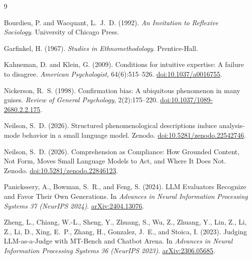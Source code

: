 \documentclass[11pt,a4paper]{article}
\begin{document}
\begin{thebibliography}{9}

Bourdieu, P. and Wacquant, L.~J.~D. (1992).
\newblock \emph{An Invitation to Reflexive Sociology}.
\newblock University of Chicago Press.

Garfinkel, H. (1967).
\newblock \emph{Studies in Ethnomethodology}.
\newblock Prentice-Hall.

Kahneman, D. and Klein, G. (2009).
\newblock Conditions for intuitive expertise: A failure to disagree.
\newblock \emph{American Psychologist}, 64(6):515--526.
  \href{https://doi.org/10.1037/a0016755}{doi:10.1037/a0016755}.

Nickerson, R.~S. (1998).
\newblock Confirmation bias: A ubiquitous phenomenon in many guises.
\newblock \emph{Review of General Psychology}, 2(2):175--220.
  \href{https://doi.org/10.1037/1089-2680.2.2.175}{doi:10.1037/1089-2680.2.2.175}.

Neilson, S.~D. (2026).
\newblock Structured phenomenological descriptions induce analysis-mode behavior
  in a small language model.
\newblock Zenodo. \href{https://doi.org/10.5281/zenodo.22542746}{doi:10.5281/zenodo.22542746}.

Neilson, S.~D. (2026).
\newblock Comprehension as Compliance: How Grounded Content, Not Form, Moves
  Small Language Models to Act, and Where It Does Not.
\newblock Zenodo. \href{https://doi.org/10.5281/zenodo.22846123}{doi:10.5281/zenodo.22846123}.

Panickssery, A., Bowman, S.~R., and Feng, S. (2024).
\newblock LLM Evaluators Recognize and Favor Their Own Generations.
\newblock In \emph{Advances in Neural Information Processing Systems 37
  (NeurIPS 2024)}.
  \href{https://arxiv.org/abs/2404.13076}{arXiv:2404.13076}.

Zheng, L., Chiang, W.-L., Sheng, Y., Zhuang, S., Wu, Z., Zhuang, Y., Lin, Z.,
  Li, Z., Li, D., Xing, E.~P., Zhang, H., Gonzalez, J.~E., and Stoica, I.
  (2023).
\newblock Judging LLM-as-a-Judge with MT-Bench and Chatbot Arena.
\newblock In \emph{Advances in Neural Information Processing Systems 36
  (NeurIPS 2023)}.
  \href{https://arxiv.org/abs/2306.05685}{arXiv:2306.05685}.

\end{thebibliography}
\end{document}
